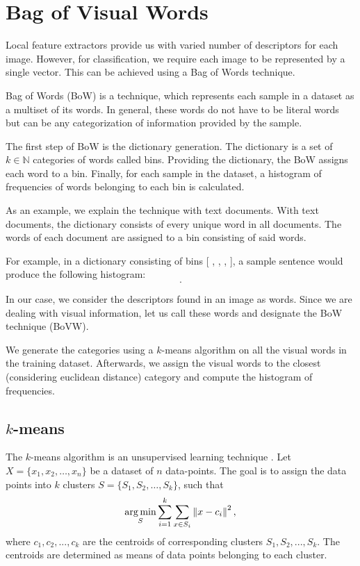 \section{Bag of Visual Words}
Local feature extractors provide us with varied number of descriptors for each image. However, for classification, we require each image to be represented by a single vector. This can be achieved using a Bag of Words technique.

Bag of Words (BoW) is a technique, which represents each sample in a dataset as a multiset of its words. In general, these words do not have to be literal words but can be any categorization of information provided by the sample.

The first step of BoW is the dictionary generation. The dictionary is a set of $k \in \mathbb{N}$ categories of words called bins. Providing the dictionary, the BoW assigns each word to a bin. Finally, for each sample in the dataset, a histogram of frequencies of words belonging to each bin is calculated.

As an example, we explain the technique with text documents. With text documents, the dictionary consists of every unique word in all documents. The words of each document are assigned to a bin consisting of said words.

For example, in a dictionary consisting of bins [ , , ,  ], a sample sentence  would produce the following histogram:
\begin{equation}
    [2, 0, 1, 1].
\end{equation}

In our case, we consider the descriptors found in an image as words. Since we are dealing with visual information, let us call these words  and designate the BoW technique  (BoVW).

We generate the categories using a $k$-means algorithm on all the visual words in the training dataset. Afterwards, we assign the visual words to the closest (considering euclidean distance) category and compute the histogram of frequencies.

\subsection{$k$-means}
The $k$-means algorithm is an unsupervised learning technique \cite{macqueen1967}. Let $X=\{ x_1, x_2, \dots, x_n \}$ be a dataset of $n$ data-points. The goal is to assign the data points into $k$ clusters $S = \{ S_1, S_2, \dots, S_k \}$, such that
\begin{equation}
    \operatorname*{arg\,min}_S \sum_{i=1}^k \sum_{x\in S_i} \left\lVert x-c_i\right\rVert^2,
\end{equation}
where \(c_1, c_2, ..., c_k \) are the centroids of corresponding clusters \(S_1, S_2, ..., S_k \). The centroids are determined as means of data points belonging to each cluster.

